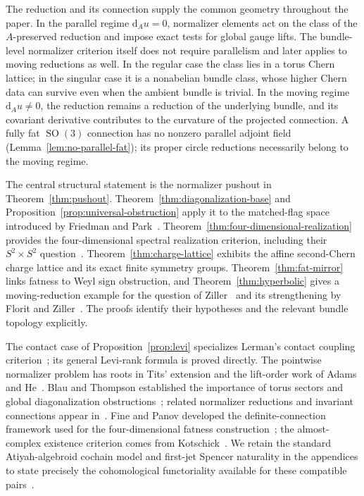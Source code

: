 \documentclass[11pt]{amsart}
\newcommand{\SO}{\operatorname{SO}}
\newcommand{\dd}{\mathrm d}
\theoremstyle{plain}
\theoremstyle{definition}
\theoremstyle{remark}
\begin{document}
The reduction and its connection supply the common geometry throughout the paper.  In the parallel regime $\dd_Au=0$, normalizer elements act on the class of the $A$-preserved reduction and impose exact tests for global gauge lifts.  The bundle-level normalizer criterion itself does not require parallelism and later applies to moving reductions as well.  In the regular case the class lies in a torus Chern lattice; in the singular case it is a nonabelian bundle class, whose higher Chern data can survive even when the ambient bundle is trivial.  In the moving regime $\dd_Au\ne0$, the reduction remains a reduction of the underlying bundle, and its covariant derivative contributes to the curvature of the projected connection.  A fully fat $\SO(3)$ connection has no nonzero parallel adjoint field (Lemma~\ref{lem:no-parallel-fat}); its proper circle reductions necessarily belong to the moving regime.

The central structural statement is the normalizer pushout in Theorem~\ref{thm:pushout}.  Theorem~\ref{thm:diagonalization-base} and Proposition~\ref{prop:universal-obstruction} apply it to the matched-flag space introduced by Friedman and Park~\cite{FriedmanPark2016}.  Theorem~\ref{thm:four-dimensional-realization} provides the four-dimensional spectral realization criterion, including their $S^2\times S^2$ question~\cite{FriedmanPark2024}.  Theorem~\ref{thm:charge-lattice} exhibits the affine second-Chern charge lattice and its exact finite symmetry groups.  Theorem~\ref{thm:fat-mirror} links fatness to Weyl sign obstruction, and Theorem~\ref{thm:hyperbolic} gives a moving-reduction example for the question of Ziller~\cite{ZillerFatness} and its strengthening by Florit and Ziller~\cite{FZ}.  The proofs identify their hypotheses and the relevant bundle topology explicitly.

The contact case of Proposition~\ref{prop:levi} specializes Lerman's contact coupling criterion~\cite{Lerman}; its general Levi-rank formula is proved directly.  The pointwise normalizer problem has roots in Tits' extension and the lift-order work of Adams and He~\cite{Tits,AdamsHe}.  Blau and Thompson established the importance of torus sectors and global diagonalization obstructions~\cite{BlauThompson}; related normalizer reductions and invariant connections appear in~\cite{BiswasMachu}.  Fine and Panov developed the definite-connection framework used for the four-dimensional fatness construction~\cite{FP}; the almost-complex existence criterion comes from Kotschick~\cite{Kotschick}.  We retain the standard Atiyah-algebroid cochain model and first-jet Spencer naturality in the appendices to state precisely the cohomological functoriality available for these compatible pairs~\cite{Atiyah,Mackenzie,Spencer,CSS}.
\end{document}
